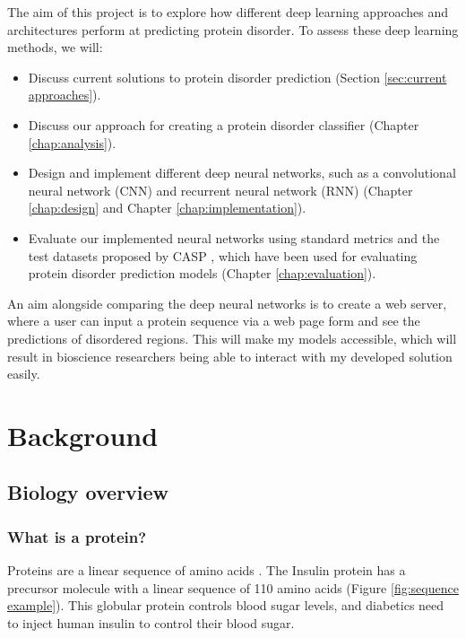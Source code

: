 \documentclass{l4proj}
\begin{document}
The aim of this project is to explore how different deep learning approaches and architectures perform at predicting protein disorder. To assess these deep learning methods, we will: 
\begin{itemize}
    \item Discuss current solutions to protein disorder prediction (Section \ref{sec:current approaches}).
    \item Discuss our approach for creating a protein disorder classifier (Chapter \ref{chap:analysis}).
    \item Design and implement different deep neural networks, such as a convolutional neural network (CNN) and recurrent neural network (RNN) (Chapter \ref{chap:design} and Chapter \ref{chap:implementation}). 
    \item Evaluate our implemented neural networks using standard metrics and the test datasets proposed by CASP \citep{casp}, which have been used for evaluating protein disorder prediction models (Chapter \ref{chap:evaluation}). 
\end{itemize}
An aim alongside comparing the deep neural networks is to create a web server, where a user can input a protein sequence via a web page form and see the predictions of disordered regions. This will make my models accessible, which will result in bioscience researchers being able to interact with my developed solution easily.


\chapter{Background}
\label{chap:background}

\section{Biology overview}

\subsection{What is a protein?}

Proteins are a linear sequence of amino acids \citep{Connor:10}. The Insulin protein has a precursor molecule with a linear sequence of 110 amino acids (Figure \ref{fig:sequence example}). This globular protein controls blood sugar levels, and diabetics need to inject human insulin to control their blood sugar.
\end{document}
